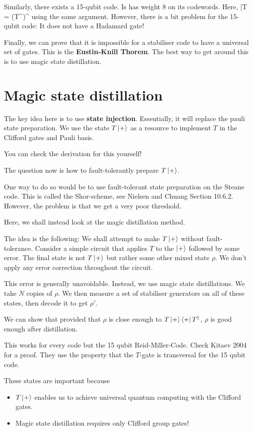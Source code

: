 Similarly, there exists a 15-qubit code. Is has weight 8 on its codewords. Here, 
\beq
\bar{T} = (T^\dagger)^{}
\eeq
using the same argument. However, there is a bit problem for the 15-qubit code: It does not have a Hadamard gate! 

Finally, we can prove that it is impossible for a stabiliser code to have a universal set of gates. This is the \textbf{Eustin-Knill Thorem}. The best way to get around this is to use magic state distillation. 

\section{Magic state distillation}
The key idea here is to use \textbf{state injection}. Essentially, it will replace the pauli state preparation. We use the state $T \ket{+}$ as a resource to implement $T$ in the Clifford gates and Pauli basis. 

You can check the derivation for this yourself! 

The question now is how to fault-tolerantly prepare $T\ket{+}$. 

One way to do so would be to use fault-tolerant state preparation on the Steane code. This is called the Shor-scheme, see Nielsen and Chuang Section 10.6.2. However, the problem is that we get a very poor threshold. 

Here, we shall instead look at the magic distillation method. 

The idea is the following: We shall attempt to make $T\ket{+}$ without fault-tolerance. Consider a simple circuit that applies $T$ to the $\ket{+}$ followed by some error. The final state is not $T\ket{+}$ but rather some other mixed state $\rho$. We don't apply any error correction throughout the circuit. 

This error is generally unavoidable. Instead, we use magic state distillations. We take $N$ copies of $\rho$. We then measure a set of stabiliser generators on all of these states, then decode it to get $\rho'$. 

We can show that provided that $\rho$ is close enough to $T\ket{+}\bra{+} T^\dagger$, $\rho$ is good enough after distillation. 

This works for every code but the 15 qubit Reid-Miller-Code. Check Kitaev 2004 for a proof. They use the property that the $T$-gate is transversal for the 15 qubit code. 

These states are important because
\begin{itemize}
\item $T\ket{+}$ enables us to achieve universal quantum computing with the Clifford gates. 
\item Magic state distillation requires only Clifford group gates! 
\end{itemize}


